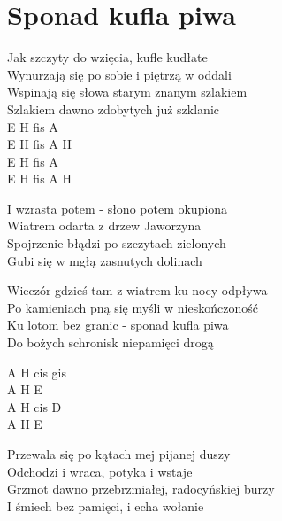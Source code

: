 \documentclass{report}
\begin{document}
\section*{Sponad kufla piwa}
\begin{paracol}{2}
Jak szczyty do wzięcia, kufle kudłate\\
Wynurzają się po sobie i piętrzą w oddali\\
Wspinają się słowa starym znanym szlakiem\\
Szlakiem dawno zdobytych już szklanic\\

\switchcolumn
E H fis A\\
E H fis A H\\
E H fis A\\
E H fis A H\\

\end{paracol}
\begin{paracol}{2}
I wzrasta potem - słono potem okupiona\\
Wiatrem odarta z drzew Jaworzyna\\
Spojrzenie błądzi po szczytach zielonych\\
Gubi się w mgłą zasnutych dolinach\\

\switchcolumn

\end{paracol}
\begin{paracol}{2}
\begin{chorus}
Wieczór gdzieś tam z wiatrem ku nocy odpływa\\
Po kamieniach pną się myśli w nieskończoność\\
Ku lotom bez granic - sponad kufla piwa\\
Do bożych schronisk niepamięci drogą\\
\end{chorus}

\switchcolumn
A H cis gis\\
A H E\\
A H cis D\\
A H E\\

\end{paracol}
\begin{paracol}{2}
Przewala się po kątach mej pijanej duszy\\
Odchodzi i wraca, potyka i wstaje\\
Grzmot dawno przebrzmiałej, radocyńskiej burzy\\
I śmiech bez pamięci, i echa wołanie\\

\switchcolumn

\end{paracol}
\end{document}
